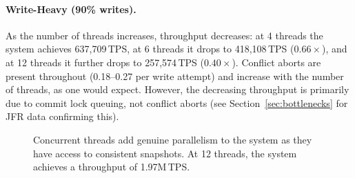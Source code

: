 \paragraph{Write-Heavy (90\% writes).}
As the number of threads increases, throughput decreases:
at 4 threads the system achieves 637,709\,TPS,
at 6 threads it drops to 418,108\,TPS ($0.66\times$), and
at 12 threads it further drops to 257,574\,TPS ($0.40\times$).
Conflict aborts are present throughout (0.18--0.27 per write attempt)
and increase with the number of threads, as one would expect. However,
the decreasing throughput is primarily due to commit lock queuing, not
conflict aborts (see Section~\ref{sec:bottlenecks} for JFR data
confirming this).

\begin{figure}[H]
  \centering
  \caption{Concurrent threads add genuine parallelism to the system as
    they have access to consistent snapshots. At 12 threads, the system
    achieves a throughput of 1.97M\,TPS.}
  \label{fig:throughput-read-heavy}
\end{figure}

